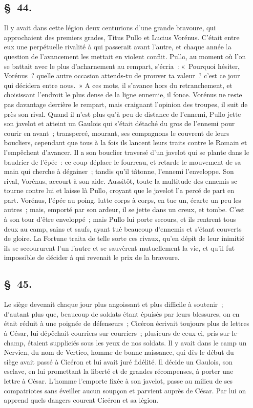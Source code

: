 \documentclass[french,twoside]{book} %
\begin{document}
\subsection[{§ 44.}]{ \textsc{§ 44.} }
\noindent Il y avait dans cette légion deux centurions d’une grande bravoure, qui approchaient des premiers grades, Titus Pullo et Lucius Vorénus. C'était entre eux une perpétuelle rivalité à qui passerait avant l’autre, et chaque année la question de l’avancement les mettait en violent conflit. Pullo, au moment où l’on se battait avec le plus d’acharnement au rempart, s’écria : « Pourquoi hésiter, Vorénus ? quelle autre occasion attends-tu de prouver ta valeur ? c’est ce jour qui décidera entre nous. » A ces mots, il s’avance hors du retranchement, et choisissant l’endroit le plus dense de la ligne ennemie, il fonce. Vorénus ne reste pas davantage derrière le rempart, mais craignant l’opinion des troupes, il suit de près son rival. Quand il n’est plus qu’à peu de distance de l’ennemi, Pullo jette son javelot et atteint un Gaulois qui s’était détaché du gros de l’ennemi pour courir en avant ; transpercé, mourant, ses compagnons le couvrent de leurs boucliers, cependant que tous à la fois ils lancent leurs traits contre le Romain et l’empêchent d’avancer. Il a son bouclier traversé d’un javelot qui se plante dans le baudrier de l’épée : ce coup déplace le fourreau, et retarde le mouvement de sa main qui cherche à dégainer ; tandis qu’il tâtonne, l’ennemi l’enveloppe. Son rival, Vorénus, accourt à son aide. Aussitôt, toute la multitude des ennemis se tourne contre lui et laisse là Pullo, croyant que le javelot l’a percé de part en part. Vorénus, l’épée au poing, lutte corps à corps, en tue un, écarte un peu les autres ; mais, emporté par son ardeur, il se jette dans un creux, et tombe. C'est à son tour d’être enveloppé ; mais Pullo lui porte secours, et ils rentrent tous deux au camp, sains et saufs, ayant tué beaucoup d’ennemis et s’étant couverts de gloire. La Fortune traita de telle sorte ces rivaux, qu’en dépit de leur inimitié ils se secoururent l’un l’autre et se sauvèrent mutuellement la vie, et qu’il fut impossible de décider à qui revenait le prix de la bravoure.
\subsection[{§ 45.}]{ \textsc{§ 45.} }
\noindent Le siège devenait chaque jour plus angoissant et plus difficile à soutenir ; d’autant plus que, beaucoup de soldats étant épuisés par leurs blessures, on en était réduit à une poignée de défenseurs ; Cicéron écrivait toujours plus de lettres à César, lui dépêchait courriers sur courriers ; plusieurs de ceux-ci, pris sur-le-champ, étaient suppliciés sous les yeux de nos soldats. Il y avait dans le camp un Nervien, du nom de Vertico, homme de bonne naissance, qui dès le début du siège avait passé à Cicéron et lui avait juré fidélité. Il décide un Gaulois, son esclave, en lui promettant la liberté et de grandes récompenses, à porter une lettre à César. L'homme l’emporte fixée à son javelot, passe au milieu de ses compatriotes sans éveiller aucun soupçon et parvient auprès de César. Par lui on apprend quels dangers courent Cicéron et sa légion.
\end{document}
